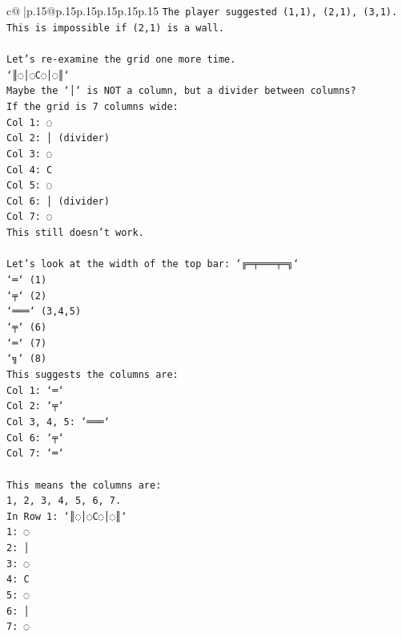 \documentclass{article}
\begin{document}
{\begin{supertabular}{c@{$\;$}|p{.15\linewidth}@{}p{.15\linewidth}p{.15\linewidth}p{.15\linewidth}p{.15\linewidth}p{.15\linewidth}}
{{{\texttt{The player suggested (1,1), (2,1), (3,1). This is impossible if (2,1) is a wall.} \\
\\ 
\texttt{Let's re{-}examine the grid one more time.} \\
\texttt{`║◌│◌C◌│◌║`} \\
\texttt{Maybe the `│` is NOT a column, but a divider between columns?} \\
\texttt{If the grid is 7 columns wide:} \\
\texttt{Col 1: ◌} \\
\texttt{Col 2: │ (divider)} \\
\texttt{Col 3: ◌} \\
\texttt{Col 4: C} \\
\texttt{Col 5: ◌} \\
\texttt{Col 6: │ (divider)} \\
\texttt{Col 7: ◌} \\
\texttt{This still doesn't work.} \\
\\ 
\texttt{Let's look at the width of the top bar: `╔═╤═══╤═╗`} \\
\texttt{`═` (1)} \\
\texttt{`╤` (2)} \\
\texttt{`═══` (3,4,5)} \\
\texttt{`╤` (6)} \\
\texttt{`═` (7)} \\
\texttt{`╗` (8)} \\
\texttt{This suggests the columns are:} \\
\texttt{Col 1: `═`} \\
\texttt{Col 2: `╤`} \\
\texttt{Col 3, 4, 5: `═══`} \\
\texttt{Col 6: `╤`} \\
\texttt{Col 7: `═`} \\
\\ 
\texttt{This means the columns are:} \\
\texttt{1, 2, 3, 4, 5, 6, 7.} \\
\texttt{In Row 1: `║◌│◌C◌│◌║`} \\
\texttt{1: ◌} \\
\texttt{2: │} \\
\texttt{3: ◌} \\
\texttt{4: C} \\
\texttt{5: ◌} \\
\texttt{6: │} \\
\texttt{7: ◌} \\
}}}
\end{supertabular}}
\end{document}
